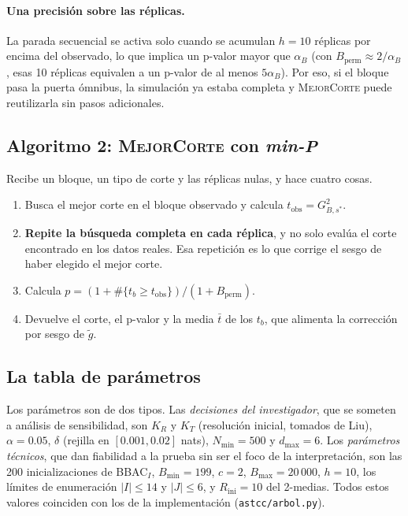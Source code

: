 \documentclass[11pt,a4paper]{article}
\begin{document}
\paragraph{Una precisión sobre las réplicas.} La parada secuencial se activa solo
cuando se acumulan $h=10$ réplicas por encima del observado, lo que implica un
p-valor mayor que $\alpha_B$ (con $B_{\mathrm{perm}}\approx2/\alpha_B$, esas 10
réplicas equivalen a un p-valor de al menos $5\alpha_B$). Por eso, si el bloque pasa la
puerta ómnibus, la simulación ya estaba completa y \textsc{MejorCorte} puede
reutilizarla sin pasos adicionales.

\subsection{Algoritmo 2: \textsc{MejorCorte} con \emph{min-P}}

Recibe un bloque, un tipo de corte y las réplicas nulas, y hace cuatro cosas.
\begin{enumerate}
\item Busca el mejor corte en el bloque observado y calcula
$t_{\mathrm{obs}}=G^2_{B,s^\ast}$.
\item \textbf{Repite la búsqueda completa en cada réplica}, y no solo evalúa el corte
encontrado en los datos reales. Esa repetición es lo que corrige el sesgo de haber
elegido el mejor corte.
\item Calcula $p=(1+\#\{t_b\ge t_{\mathrm{obs}}\})/(1+B_{\mathrm{perm}})$.
\item Devuelve el corte, el p-valor y la media $\bar t$ de los $t_b$, que alimenta la
corrección por sesgo de $\tilde g$.
\end{enumerate}

\subsection{La tabla de parámetros}

Los parámetros son de dos tipos. Las \emph{decisiones del investigador}, que se
someten a análisis de sensibilidad, son $K_R$ y $K_T$ (resolución inicial, tomados de
Liu), $\alpha=0.05$, $\delta$ (rejilla en $[0.001,0.02]$ nats), $N_{\min}=500$ y
$d_{\max}=6$. Los \emph{parámetros técnicos}, que dan fiabilidad a la prueba sin ser el
foco de la interpretación, son las 200 inicializaciones de BBAC$_I$,
$B_{\min}=199$, $c=2$, $B_{\max}=20\,000$, $h=10$, los límites de enumeración
$|I|\le14$ y $|J|\le6$, y $R_{\mathrm{ini}}=10$ del 2-medias. Todos estos valores
coinciden con los de la implementación (\texttt{astcc/arbol.py}).
\end{document}
